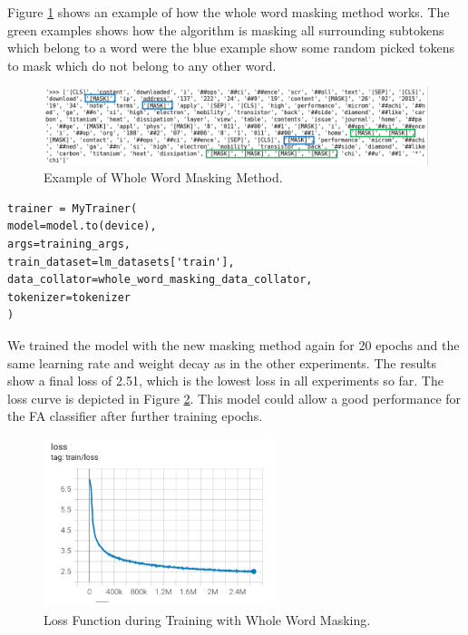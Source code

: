 \alert{Figure \ref{fig:wwm_ex} shows an example of how the whole word masking method works. The green examples shows how the algorithm is masking all surrounding subtokens which belong to a word were the blue example show some random picked tokens to mask which do not belong to any other word.}

\begin{figure}[H]
 	\centering
 	\includegraphics[width=1\textwidth]{figures/wwm_example.png}
 	\caption{Example of Whole Word Masking Method.}
 	\label{fig:wwm_ex}
 \end{figure}

\begin{code}
\label{code:trainer_wwm}
\begin{verbatim}
trainer = MyTrainer(
model=model.to(device),
args=training_args,
train_dataset=lm_datasets['train'],
data_collator=whole_word_masking_data_collator,
tokenizer=tokenizer
)
\end{verbatim}
\end{code}

We trained the model with the new masking method again for 20 epochs and the same learning rate and weight decay as in the other experiments. The results show a final loss of 2.51, which is the lowest loss in all experiments so far. The loss curve is depicted in Figure \ref{fig:loss_wwm}. This model could allow a good performance for the FA classifier after further training epochs. 

\begin{figure}[H]
	\centering
	\includegraphics[width=0.6\textwidth]{figures/loss_wwm.png}
	\caption{Loss Function during Training with Whole Word Masking.}
	\label{fig:loss_wwm}
\end{figure}